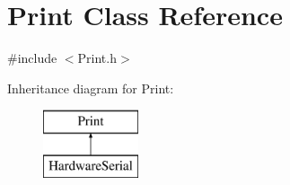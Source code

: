 \hypertarget{classPrint}{\section{Print Class Reference}
\label{classPrint}
}


{\ttfamily \#include $<$Print.\-h$>$}

Inheritance diagram for Print\-:\begin{figure}[H]
\begin{center}
\leavevmode
\includegraphics[height=2.000000cm]{classPrint}
\end{center}
\end{figure}
